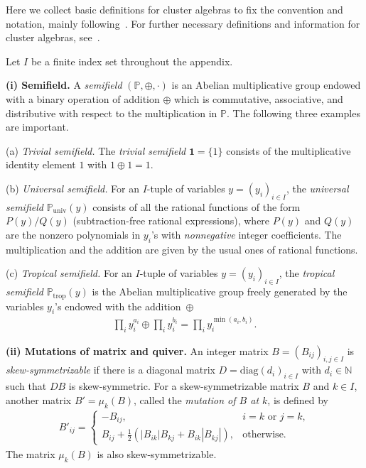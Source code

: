 \documentclass[pdftex]{sigma}
\numberwithin{equation}{section}
\theoremstyle{definition}
\begin{document}
\label{sec:groc}

Here we collect basic def\/initions for cluster algebras
to f\/ix the convention and notation,
mainly following~\cite{Fomin07}.
For further necessary def\/initions and information
for cluster algebras, see~\cite{Fomin07}.

Let $I$ be a f\/inite index set throughout the appendix.

{\bf (i) Semif\/ield.}
A {\em semifield\/} $(\mathbb{P},\oplus, \cdot)$
is an Abelian multiplicative group
endowed with a binary
operation of addition $\oplus$ which is commutative,
associative, and distributive with respect to the
multiplication in $\mathbb{P}$.
The following three examples are important.


(a) {\em  Trivial semifield.}
The {\em trivial semifield\/}
$\mathbf{1}=\{\mathrm{1}\}$
consists of the multiplicative identity element $1$
with $1\oplus 1 = 1$.

\par
(b) {\em Universal semifield.}
For an $I$-tuple of variables $y=(y_i)_{i\in I}$,
the {\em universal semifield\/}
$\mathbb{P}_{\mathrm{univ}}(y)$
consists of  all the rational functions
of the form
$P(y)/Q(y)$  (subtraction-free  rational expressions),
where $P(y)$ and $Q(y)$ are the nonzero polynomials
 in $y_i$'s with {\em nonnegative\/} integer coef\/f\/icients.
The multiplication and the addition
are given by the usual ones of rational functions.


(c) {\em Tropical semifield.}
For an $I$-tuple of variables $y=(y_i)_{i\in I}$,
the {\em tropical semifield\/}
$\mathbb{P}_{\mathrm{trop}}(y)$
is the Abelian multiplicative group freely generated by
the variables  $y_i$'s endowed with the addition~$\oplus$
\begin{gather}
\label{eq:trop}
\prod_i y_i^{a_i}\oplus
\prod_i y_i^{b_i}
=
\prod_i y_i^{\min(a_i,b_i)}.
\end{gather}



{\bf (ii)  Mutations of matrix and quiver.}
An integer matrix
$B=(B_{ij})_{i,j\in I}$  is {\em skew-sym\-met\-ri\-zab\-le\/}
if there is a diagonal matrix $D=\mathrm{diag}
(d_i)_{i\in I}$ with $d_i\in \mathbb{N}$
such that $DB$ is skew-symmetric.
For a skew-symmetrizable matrix $B$ and
$k\in I$, another matrix $B'=\mu_k(B)$,
called the {\em mutation of $B$ at $k$\/}, is def\/ined by
\begin{gather}
\label{eq:Bmut}
B'_{ij}=
\begin{cases}
-B_{ij},& \mbox{$i=k$ or $j=k$},\\
B_{ij}+\frac{1}{2}
(|B_{ik}|B_{kj} + B_{ik}|B_{kj}|),
&\mbox{otherwise}.
\end{cases}
\end{gather}
The matrix $\mu_k(B)$ is also skew-symmetrizable.
\end{document}
